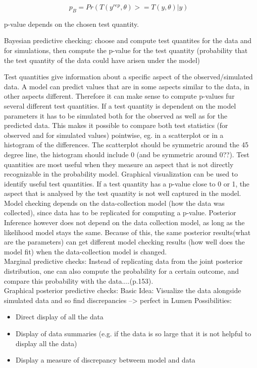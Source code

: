 \documentclass{article}
\begin{document}
\begin{equation}
p_B = Pr(T(y^{rep},\theta) >= T(y,\theta) | y)
\label{eq:bayesian_p}
\end{equation}

p-value depends on the chosen test quantity.


Bayesian predictive checking: choose and compute test quantites for the data and for simulations, then compute the p-value for the test quantity (probability that the test quantity of the data could have arisen under the model)

Test quantities give information about a specific aspect of the observed/simulated data. A model can predict values that are in some aspects similar to the data, in other aspects different. Therefore it can make sense to compute p-values fur several different test quantities.
If a test quantity is dependent on the model parameters it has to be simulated both for the observed as well as for the predicted data. This makes it possible to compare both test statistics (for observed and for simulated values) pointwise, eg. in a scatterplot or in a histogram of the differences. The scatterplot should be symmetric around the 45 degree line, the histogram should include 0 (and be symmetric around 0??).
Test quantities are most useful when they measure an aspect that is not directly recognizable in the probability model.
Graphical visualization can be used to identify useful test quantities.
If a test quantity has a p-value close to 0 or 1, the aspect that is analysed by the test quantity is not well captured in the model.
\\
Model checking depends on the data-collection model (how the data was collected), since data has to be replicated for computing a p-value. Posterior Inference however does not depend on the data collection model, as long as the likelihood model stays the same. Because of this, the same posterior results(what are the parameters) can get different model checking results (how well does the model fit) when the data-collection model is changed.
\\
Marginal predictive checks: Instead of replicating data from the joint posterior distribution, one can also compute the probability for a certain outcome, and compare this probability with the data....(p.153).
\\
Graphical posterior predictive checks: Basic Idea: Visualize the data alongside simulated data and so find discrepancies --> perfect in Lumen 
Possibilities:
\begin{itemize}
	\item Direct display of all the data
	\item Display of data summaries (e.g. if the data is so large that it is not helpful to display all the data)
	\item Display a measure of discrepancy betweem model and data
\end{itemize}
\end{document}
